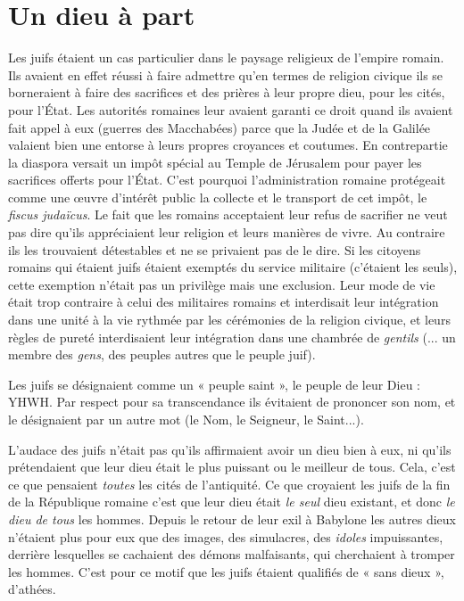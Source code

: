 \section{Un dieu à part}

 Les juifs étaient un cas particulier dans le paysage religieux de l'empire romain. Ils avaient en effet réussi à faire admettre qu'en termes de religion civique ils se borneraient à faire des sacrifices et des prières à leur propre dieu, pour les cités, pour l'État. Les autorités romaines leur avaient garanti ce droit quand ils avaient fait appel à eux (guerres des Macchabées) parce que la Judée et de la Galilée valaient bien une entorse à leurs propres croyances et coutumes. En contrepartie la diaspora versait un impôt spécial au Temple de Jérusalem pour payer les sacrifices offerts pour l'État. C'est pourquoi l'administration romaine protégeait comme une œuvre d'intérêt public la collecte et le transport de cet impôt, le \emph{fiscus judaïcus}. Le fait que les romains acceptaient leur refus de sacrifier ne veut pas dire qu'ils appréciaient leur religion et leurs manières de vivre. Au contraire ils les trouvaient détestables et ne se privaient pas de le dire. Si les citoyens romains qui étaient juifs étaient exemptés du service militaire (c'étaient les seuls), cette exemption n'était pas un privilège mais une exclusion. Leur mode de vie était trop contraire à celui des militaires romains et interdisait leur intégration dans une unité à la vie rythmée par les cérémonies de la religion civique, et leurs règles de pureté interdisaient leur intégration dans une chambrée de \emph{gentils} (... un membre des \emph{gens}, des peuples autres que le peuple juif). 

 Les juifs se désignaient comme un « peuple saint », le peuple de leur Dieu : YHWH. Par respect pour sa transcendance ils évitaient de prononcer son nom, et le désignaient par un autre mot (le Nom, le Seigneur, le Saint...). 

 L'audace des juifs n'était pas qu'ils affirmaient avoir un dieu bien à eux, ni qu'ils prétendaient que leur dieu était le plus puissant ou le meilleur de tous. Cela, c'est ce que pensaient \emph{toutes} les cités de l'antiquité. Ce que croyaient les juifs de la fin de la République romaine c'est que leur dieu était \emph{le seul} dieu existant, et donc \emph{le dieu de tous} les hommes. Depuis le retour de leur exil à Babylone les autres dieux n'étaient plus pour eux que des images, des simulacres, des \emph{idoles} impuissantes, derrière lesquelles se cachaient des démons malfaisants, qui cherchaient à tromper les hommes. C'est pour ce motif que les juifs étaient qualifiés de « {sans dieux} », d'athées. 

